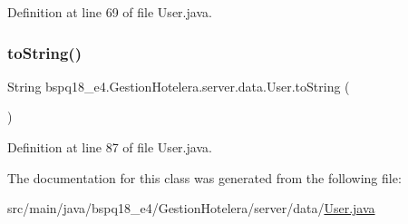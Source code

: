Definition at line 69 of file User.\+java.

\mbox{\label{classbspq18__e4_1_1_gestion_hotelera_1_1server_1_1data_1_1_user_adb8b16c2135d62e11a93ef4f77190181}} 
\subsubsection{\texorpdfstring{to\+String()}{toString()}}
{\footnotesize\ttfamily String bspq18\+\_\+e4.\+Gestion\+Hotelera.\+server.\+data.\+User.\+to\+String (\begin{DoxyParamCaption}{ }\end{DoxyParamCaption})}



Definition at line 87 of file User.\+java.



The documentation for this class was generated from the following file\+:\begin{DoxyCompactItemize}
\item 
src/main/java/bspq18\+\_\+e4/\+Gestion\+Hotelera/server/data/\mbox{\hyperlink{_user_8java}{User.\+java}}\end{DoxyCompactItemize}
